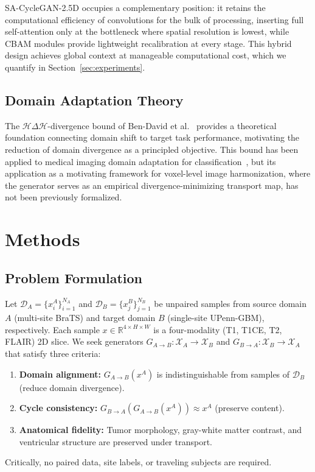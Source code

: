 \documentclass{article}
\begin{document}
SA-CycleGAN-2.5D occupies a complementary position: it retains the computational
efficiency of convolutions for the bulk of processing, inserting full self-attention only
at the bottleneck where spatial resolution is lowest, while CBAM modules provide
lightweight recalibration at every stage. This hybrid design achieves global context at
manageable computational cost, which we quantify in Section~\ref{sec:experiments}.

\subsection{Domain Adaptation Theory}

The $\mathcal{H}\Delta\mathcal{H}$-divergence bound of Ben-David et al.~\cite{ben2010theory}
provides a theoretical foundation connecting domain shift to target task performance,
motivating the reduction of domain divergence as a principled objective. This bound has
been applied to medical imaging domain adaptation for classification~\cite{dinsdale2021deep},
but its application as a motivating framework for voxel-level image harmonization,
where the generator serves as an empirical divergence-minimizing transport map, has not
been previously formalized.

\section{Methods}
\label{sec:methods}

\subsection{Problem Formulation}

Let $\mathcal{D}_A = \{x_i^A\}_{i=1}^{N_A}$ and $\mathcal{D}_B = \{x_j^B\}_{j=1}^{N_B}$
be unpaired samples from source domain $A$ (multi-site BraTS) and target domain $B$
(single-site UPenn-GBM), respectively. Each sample $x \in \mathbb{R}^{4 \times H \times W}$
is a four-modality (T1, T1CE, T2, FLAIR) 2D slice. We seek generators
$G_{A \to B}: \mathcal{X}_A \to \mathcal{X}_B$ and $G_{B \to A}: \mathcal{X}_B \to \mathcal{X}_A$
that satisfy three criteria:
\begin{enumerate}
  \item \textbf{Domain alignment:} $G_{A\to B}(x^A)$ is indistinguishable from samples
        of $\mathcal{D}_B$ (reduce domain divergence).
  \item \textbf{Cycle consistency:} $G_{B\to A}(G_{A\to B}(x^A)) \approx x^A$ (preserve
        content).
  \item \textbf{Anatomical fidelity:} Tumor morphology, gray-white matter contrast, and
        ventricular structure are preserved under transport.
\end{enumerate}
Critically, no paired data, site labels, or traveling subjects are required.
\end{document}
